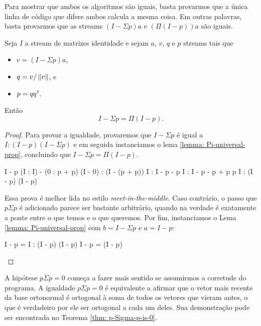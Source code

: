 
Para mostrar que ambos os algoritmos são iguais, basta provarmos que a única linha de código que difere ambos calcula a mesma coisa. Em outras palavras, basta provarmos que as streams $(I - \Sigma p) a$ e $(\Pi(I - p)) a$ são iguais.

\begin{theorem}\label{thm: equality-of-streams}
  Seja $I$ a stream de matrizes identidade e sejam $a$, $v$, $q$ e $p$ streams tais que
  \begin{itemize}
    \item $v = (I - \Sigma p) a$,
    \item $q = v / \left\lVert v\right\rVert$, e
    \item $p = qq^{\scriptscriptstyle\mathsf{T}\mkern-1mu}$.
  \end{itemize}
  Então
  \[I - \Sigma p = \Pi (I - p).\]
\end{theorem}
\begin{proof}
  Para provar a igualdade, provaremos que $I - \Sigma p$ é igual a $I : (I - p)(I - \Sigma p)$ e em seguida instanciamos o lema \ref{lemma: Pi-universal-prop}, concluindo que $I - \Sigma p = \Pi(I - p)$.

  \begin{calculation}[=]
  I - \Sigma p
  (I : I) - (0 : p + \Sigma p)
  (I - 0) : (I - (p + \Sigma p))
  I : I - p - \Sigma p
  I : I - p - \Sigma p + p \Sigma p
  I : (I - p) (I - \Sigma p)
  \end{calculation}

  Essa prova é melhor lida no estilo \emph{meet-in-the-middle}. Caso contrário, o passo que $p \Sigma p$ é adicionado parece ser bastante arbitrário, quando na verdade é exatamente a ponte entre o que temos e o que queremos. Por fim, instanciamos o Lema \ref{lemma: Pi-universal-prop} com $b = I - \Sigma p$ e $a = I - p$:

  \begin{calculation}[\calciff]
    I - \Sigma p = I : (I - p) (I - \Sigma p)
    I - \Sigma p = \Pi(I - p)
  \end{calculation}
\end{proof}

A hipótese $p \Sigma p = 0$ começa a fazer mais sentido se assumirmos a corretude do programa. A igualdade $p \Sigma p = 0$ é equivalente a afirmar que o vetor mais recente da base ortonormal é ortogonal à soma de todos os vetores que vieram antes, o que é verdadeiro por ele ser ortogonal a cada um deles. Sua demonstração pode ser encontrada no Teorema \ref{thm: p-Sigma-p-is-0}.


